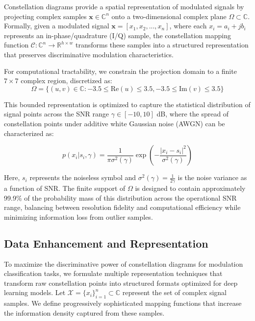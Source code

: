 Constellation diagrams provide a spatial representation of modulated signals by projecting complex samples $\mathbf{x} \in \mathbb{C}^n$ onto a two-dimensional complex plane $\Omega \subset \mathbb{C}$. Formally, given a modulated signal $\mathbf{x} = [x_1, x_2, ..., x_n]$, where each $x_i = a_i + jb_i$ represents an in-phase/quadrature (I/Q) sample, the constellation mapping function $\mathcal{C}: \mathbb{C}^n \rightarrow \mathbb{R}^{h \times w}$ transforms these samples into a structured representation that preserves discriminative modulation characteristics.

For computational tractability, we constrain the projection domain to a finite $7 \times 7$ complex region, discretized as:
\begin{equation}
\Omega = \{(u,v) \in \mathbb{C} : -3.5 \leq \text{Re}(u) \leq 3.5, -3.5 \leq \text{Im}(v) \leq 3.5\}
\end{equation}

This bounded representation is optimized to capture the statistical distribution of signal points across the SNR range $\gamma \in [-10, 10]$ dB, where the spread of constellation points under additive white Gaussian noise (AWGN) can be characterized as:

\begin{equation}
p(x_i | s_i, \gamma) = \frac{1}{\pi\sigma^2(\gamma)}\exp\left(-\frac{|x_i - s_i|^2}{\sigma^2(\gamma)}\right)
\end{equation}

Here, $s_i$ represents the noiseless symbol and $\sigma^2(\gamma) = \frac{1}{2\gamma}$ is the noise variance as a function of SNR. The finite support of $\Omega$ is designed to contain approximately 99.9\% of the probability mass of this distribution across the operational SNR range, balancing between resolution fidelity and computational efficiency while minimizing information loss from outlier samples.

\subsection{Data Enhancement and Representation}

To maximize the discriminative power of constellation diagrams for modulation classification tasks, we formulate multiple representation techniques that transform raw constellation points into structured formats optimized for deep learning models. Let $\mathcal{X} = \{x_i\}_{i=1}^n \subset \mathbb{C}$ represent the set of complex signal samples. We define progressively sophisticated mapping functions that increase the information density captured from these samples.

